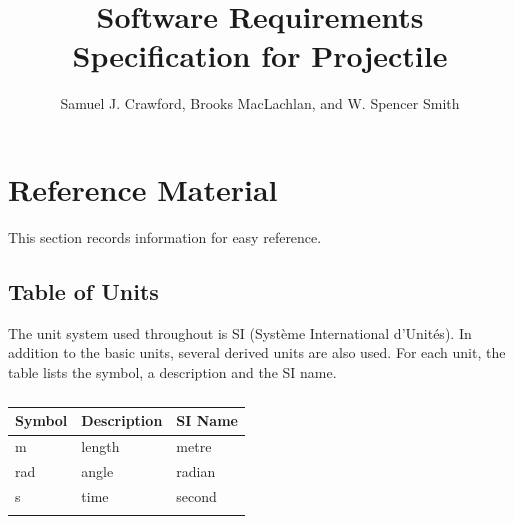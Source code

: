 \documentclass[12pt]{article}
\title{Software Requirements Specification for Projectile}
\author{Samuel J. Crawford, Brooks MacLachlan, and W. Spencer Smith}
\begin{document}
\maketitle
\tableofcontents
\newpage
\section{Reference Material}
\label{Sec:RefMat}
This section records information for easy reference.
\subsection{Table of Units}
\label{Sec:ToU}
The unit system used throughout is SI (Système International d'Unités). In addition to the basic units, several derived units are also used. For each unit, the table lists the symbol, a description and the SI name.
\begin{longtable}{l l l}
\toprule
\textbf{Symbol} & \textbf{Description} & \textbf{SI Name}
\\
\midrule
\endhead
m & length & metre
\\
rad & angle & radian
\\
s & time & second
\\
\bottomrule
\caption{}
\label{Table:ToU}
\end{longtable}
\end{document}
